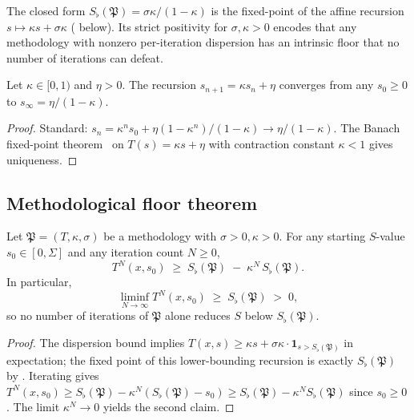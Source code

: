 \documentclass[twocolumn,11pt,a4paper]{article}
\newcommand{\Method}{\mathfrak{P}}
\newcommand{\Sfloor}{S_{\flat}}
\begin{document}
\begin{remark}\label{rem:why-this-floor}
The closed form $\Sfloor(\Method)=\sigma\kappa/(1-\kappa)$ is the
fixed-point of the affine recursion $s\mapsto\kappa s+\sigma\kappa$
( below). Its strict positivity for $\sigma,\kappa>0$
encodes that any methodology with nonzero per-iteration dispersion has an
intrinsic floor that no number of iterations can defeat.
\end{remark}

\begin{lemma}\label{lem:fixed-point}
Let $\kappa\in[0,1)$ and $\eta>0$. The recursion
$s_{n+1}=\kappa s_n+\eta$ converges from any $s_0\ge 0$ to
$s_\infty=\eta/(1-\kappa)$.
\end{lemma}

\begin{proof}
Standard: $s_n=\kappa^n s_0+\eta(1-\kappa^n)/(1-\kappa)\to\eta/(1-\kappa)$.
The Banach fixed-point theorem~\cite{banach1922} on
$T(s)=\kappa s+\eta$ with contraction constant $\kappa<1$ gives
uniqueness.
\end{proof}

\subsection{Methodological floor theorem}

\begin{theorem}\label{thm:method-floor}
Let $\Method=(T,\kappa,\sigma)$ be a methodology with $\sigma>0,\kappa>0$.
For any starting $S$-value $s_0\in[0,\Sigma]$ and any iteration count
$N\ge 0$,
\[
T^N(x,s_0)\;\ge\;\Sfloor(\Method)\;-\;\kappa^N\,\Sfloor(\Method).
\]
In particular,
\[
\liminf_{N\to\infty}T^N(x,s_0)\;\ge\;\Sfloor(\Method)\;>\;0,
\]
so no number of iterations of $\Method$ alone reduces $S$ below
$\Sfloor(\Method)$.
\end{theorem}

\begin{proof}
The dispersion bound implies
$T(x,s)\ge\kappa s+\sigma\kappa\cdot\mathbf{1}_{s>\Sfloor(\Method)}$ in
expectation; the fixed point of this lower-bounding recursion is exactly
$\Sfloor(\Method)$ by . Iterating gives
$T^N(x,s_0)\ge\Sfloor(\Method)-\kappa^N(\Sfloor(\Method)-s_0)\ge
\Sfloor(\Method)-\kappa^N\Sfloor(\Method)$ since $s_0\ge 0$. The limit
$\kappa^N\to 0$ yields the second claim.
\end{proof}
\end{document}

